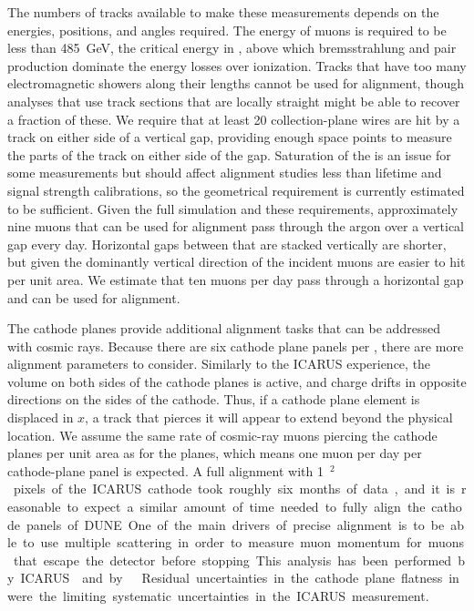 The numbers of tracks available to make these measurements depends on the energies, positions, and angles
required.  The energy of muons is required to be less than \SI{485}{\GeV}, the critical energy in ,
above which bremsstrahlung and pair production dominate the energy losses over ionization.  Tracks
that have too many electromagnetic showers along their lengths cannot be used for alignment, though
analyses that use track sections that are locally straight might be able to recover a fraction of these.
We require that at least \num{20} collection-plane wires are hit by a track on either side of a vertical gap, providing
enough space points to measure the parts of the track on either side of the gap.  Saturation of the 
is an issue for some measurements but should affect alignment studies less than lifetime and signal
strength calibrations, so the geometrical requirement is currently estimated to be sufficient.
Given the full simulation and these requirements, approximately nine muons that can be used for alignment
pass through the argon over a vertical gap every day.  Horizontal gaps between  that are stacked
vertically are shorter, but given the dominantly vertical direction of the incident muons are easier
to hit per unit area.  We estimate that ten muons per day pass through a horizontal gap and can be
used for alignment.

The cathode planes provide additional alignment tasks that can be addressed with cosmic rays.
Because there are six cathode plane panels per , there are more alignment parameters to consider.
Similarly to the ICARUS experience, the volume on both sides of the cathode planes is active, and charge
drifts in opposite directions on the sides of the cathode.  Thus, if a cathode plane element is displaced
in $x$, a track that pierces it will appear to extend beyond the physical location.  We assume the
same rate of cosmic-ray muons piercing the cathode planes per unit area as for the  planes, which
means one muon per day per cathode-plane panel is expected.  A full alignment with \SI{1}{\m$^2$} pixels of the
ICARUS cathode took roughly six months of data, and it is reasonable to expect a similar amount of time
needed to fully align the cathode panels of DUNE.

One of the main drivers of precise alignment is to be able to use multiple scattering in order to
measure muon momentum for muons that escape the detector before stopping.  
This analysis has been performed by ICARUS~\cite{Antonello:2016niy} and by \microboone~\cite{Abratenko:2017nki}.
Residual uncertainties in the cathode plane flatness in were the limiting systematic uncertainties
in the ICARUS measurement.

